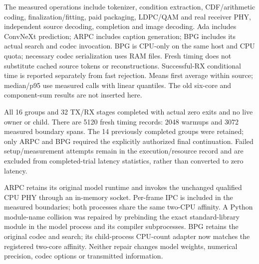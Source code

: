 \documentclass[10pt,letterpaper]{article}
\begin{document}
The measured operations include tokenizer, condition extraction, CDF/arithmetic coding, finalization/fitting, paid packaging, LDPC/QAM and real receiver PHY, independent source decoding, completion and image decoding. Ada includes ConvNeXt prediction; ARPC includes caption generation; BPG includes its actual search and codec invocation. BPG is CPU-only on the same host and CPU quota; necessary codec serialization uses RAM files. Fresh timing does not substitute cached source tokens or reconstructions. Successful-RX conditional time is reported separately from fast rejection. Means first average within source; median/p95 use measured calls with linear quantiles. The old six-core and component-sum results are not inserted here.

All 16 groups and 32 TX/RX stages completed with actual zero exits and no live owner or child. There are 5120 fresh timing records: 2048 warmups and 3072 measured boundary spans. The 14 previously completed groups were retained; only ARPC and BPG required the explicitly authorized final continuation. Failed setup/measurement attempts remain in the execution/resource record and are excluded from completed-trial latency statistics, rather than converted to zero latency.

ARPC retains its original model runtime and invokes the unchanged qualified CPU PHY through an in-memory socket. Per-frame IPC is included in the measured boundaries; both processes share the same two-CPU affinity. A Python module-name collision was repaired by prebinding the exact standard-library module in the model process and its compiler subprocesses. BPG retains the original codec and search; its child-process CPU-count adapter now matches the registered two-core affinity. Neither repair changes model weights, numerical precision, codec options or transmitted information.
\end{document}
